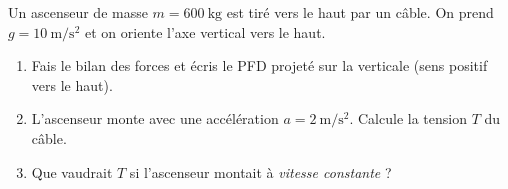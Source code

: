 \documentclass[11pt,a4paper]{article}
\newcommand{\vv}[1]{\vec{#1}}\newcommand{\ds}{\displaystyle}
\begin{document}
\begin{exo}
Un ascenseur de masse $m=\qty{600}{\kilogram}$ est tiré vers le haut par un câble. On prend
$g=\qty{10}{\metre\per\second\squared}$ et on oriente l'axe vertical vers le haut.
\begin{center}
\end{center}
\begin{enumerate}[label=\alph*)]
  \item Fais le bilan des forces et écris le PFD projeté sur la verticale (sens positif vers le haut).
  \item L'ascenseur monte avec une accélération $a=\qty{2}{\metre\per\second\squared}$. Calcule la tension $T$ du câble.
  \item Que vaudrait $T$ si l'ascenseur montait à \emph{vitesse constante} ?
\end{enumerate}
\end{exo}
\end{document}
